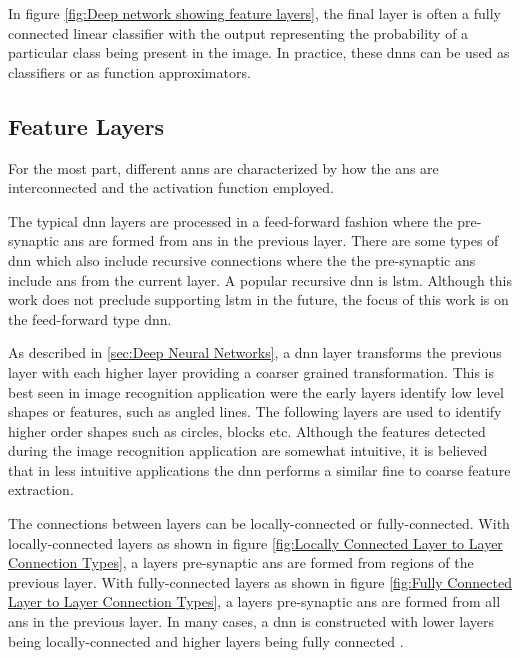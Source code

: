 In figure \ref{fig:Deep network showing feature layers}, the final layer is often a fully connected linear classifier with the output representing the probability of a particular class being present in the image.
In practice, these \acp{dnn} can be used as classifiers or as function approximators.

\iffalse
In practice, useful deep neural networks are very large and often exceed the capacity of single GPUs. Therefore,  there is opportunity for a solution that provides
real-time acceleration and storage of of these systems.
\fi


\subsection{Feature Layers}
\label{sec:Feature Layers}

For the most part, different \acp{ann} are characterized by how the \acp{an} are interconnected and the activation function employed.

The typical \ac{dnn} layers are processed in a feed-forward fashion where the pre-synaptic \acp{an} are formed from \acp{an} in the previous layer.
There are some types of \ac{dnn} which also include recursive connections where the the pre-synaptic \acp{an} include \acp{an} from the current layer.
A popular recursive \ac{dnn} is \acf{lstm}. Although this work does not preclude supporting \ac{lstm} in the future, the focus of this work is on the feed-forward type \ac{dnn}.

As described in \ref{sec:Deep Neural Networks}, a \ac{dnn} layer transforms the previous layer with each higher layer providing a coarser grained transformation. 
This is best seen in image recognition application were the early layers identify low level shapes or features, such as angled lines. 
The following layers are used to identify higher order shapes such as circles, blocks etc. 
Although the features detected during the image recognition application are somewhat intuitive, it is believed that in less intuitive applications the \ac{dnn} performs a similar fine to coarse feature extraction.

The connections between layers can be locally-connected or fully-connected. 
With locally-connected layers as shown in figure \ref{fig:Locally Connected Layer to Layer Connection Types}, a layers pre-synaptic \acp{an} are formed from regions of the previous layer.
With fully-connected layers as shown in figure \ref{fig:Fully Connected Layer to Layer Connection Types}, a layers pre-synaptic \acp{an} are formed from all \acp{an} in the previous layer.
In many cases, a \ac{dnn} is constructed with lower layers being locally-connected and higher layers being fully connected \cite{krizhevsky2012imagenet}.

